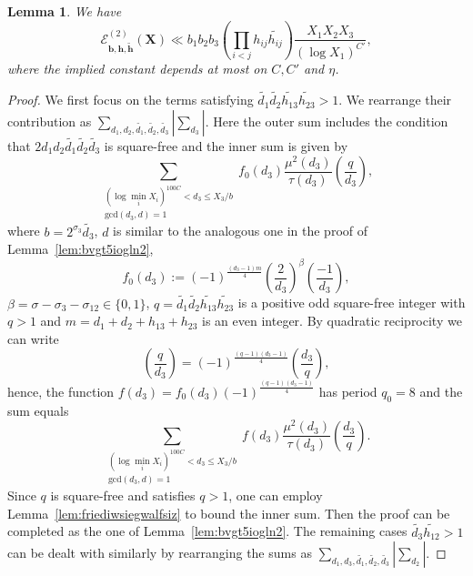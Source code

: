\documentclass[a4paper,12pt,reqno]{amsart}
\numberwithin{equation}{section} \numberwithin{figure}{section}
\renewcommand{\l}{\left}
\renewcommand{\r}{\right}
\renewcommand{\b}{\mathbf}
\renewcommand{\c}{\mathcal}
\renewcommand{\gcd}{\textrm{gcd}}
\renewcommand{\leq}{\leqslant}
\renewcommand{\#}{\sharp}
\newtheorem{lemma}{Lemma}
\theoremstyle{definition}
\numberwithin{lemma}{section}
\begin{document}
 
\begin{lemma}
\label{lem:bvchhar29}  
We have 
 $$ \c {E}_{  \b b,\b h ,  \widetilde{\b h } }^{(2)}( \b X )
\ll
  b_1b_2b_3 \l(\prod_{i<j }h_{ij} \widetilde{   h_{ij}  }  \r)    \frac{X_1 X_2 X_3 }{ (\log X_1)^{C'}  }   ,$$
 where the implied constant depends at most on  $C, C'$ and $\eta$. 
\end{lemma} \begin{proof}  We  first focus on  
  the terms satisfying  $ \widetilde{d_1    }\widetilde{ d_2 }  \widetilde{  h_{13} }\widetilde{  h_{23 }} >1 $.
 We
rearrange their contribution as  $  \sum_{d_1, d_2,  \widetilde{d_1} , \widetilde{d_2}  ,  \widetilde{d_3}  }  | \sum_{ d_3   } |$.
Here the outer sum includes the condition that  $ 2 d_1  d_2   \widetilde{d_1}   \widetilde{d_2}     \widetilde{d_3}$  is square-free and the
  inner sum is given by \[  
 \sum_{\substack{ (\log \min_i X_i)^{100C }  <  d_3 \leq   X_3/b
  \\
\gcd( d_3 , d ) =1  }}
f_0(d_3)
\frac{\mu^2(d_3  )}{\tau( d_3 )}  
\l(\frac{  q  }{d_3  }\r) 
,\]  where $b=2^{\sigma_3} \widetilde{d_3}$,  $ d $ is similar to the analogous one  in the proof of Lemma~\ref {lem:bvgt5iogln2},
\[f_0(d_3):=
(-1)^{\frac{(d_3 -1 ) m  }{4}}   \l(\frac{2}{d_3 }  \r) ^ \beta 
 \l(\frac{-1}{d_3 }  \r)  
,\]     $\beta=\sigma-\sigma_3-\sigma_{12}\in \{0,1\}$,  
$q=  \widetilde{d_1    }\widetilde{ d_2 }  \widetilde{  h_{13} }\widetilde{  h_{23 }}   $ is a positive odd square-free integer with $q >1 $
and
 $m =d_1+d_2+h_{13}+h_{23} $ is an even integer. 
 By  quadratic reciprocity we can  write 
$$  \l (\frac{q}{d_3 } \r)   =  (-1)^{\frac{ (q-1)(d_3-1)}{4} } \l (\frac{d_3 }{q} \r) ,$$ hence, 
the function $f(d_3)=f_0(d_3) (-1)^{\frac{ (q-1)(d_3-1)}{4} } $ has period $q_0=8$ and the sum equals
 \[  
 \sum_{\substack{ (\log \min_i X_i)^{100C }  <  d_3 \leq   X_3/b
  \\
\gcd( d_3 , d ) =1  }}
f (d_3)
\frac{\mu^2(d_3  )}{\tau( d_3 )}  
\l(\frac{d_3  }{  q  }\r) 
.\] Since $q$ is square-free and satisfies $q>1$, 
one can employ  Lemma~\ref{lem:friediwsiegwalfsiz}  
to bound the inner sum.  Then  the proof can be completed as  the one of   Lemma~\ref {lem:bvgt5iogln2}.
 The remaining cases  $  \widetilde{  d_3  }\widetilde{ h_{12} } >1 $ can be dealt with similarly by 
rearranging the sums as $  \sum_{d_1, d_3,  \widetilde{d_1} , \widetilde{d_2}  ,  \widetilde{d_3}  }  | \sum_{ d_2   } |$.   \end{proof}  

 
\end{document}

